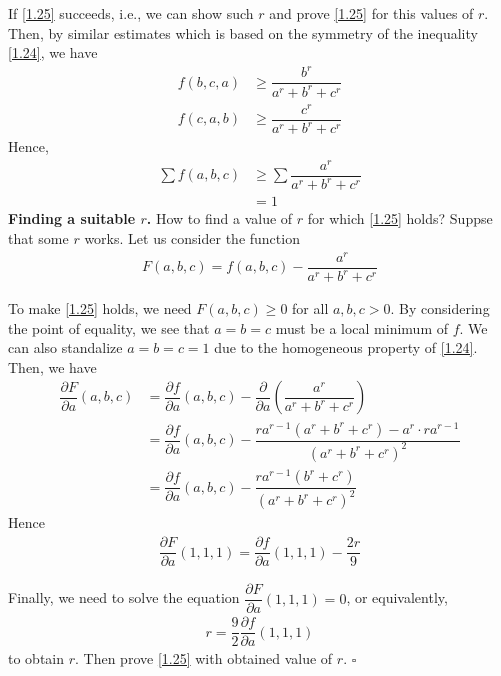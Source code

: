 \documentclass[a4paper,oneside]{article}
\numberwithin{equation}{section}
\begin{document}
If \eqref{1.25} succeeds, i.e., we can show such $r$ and prove \eqref{1.25} for this values of $r$. Then, by similar estimates which is based on the symmetry of the inequality \eqref{1.24}, we have
\begin{align}
f\left( {b,c,a} \right) &\ge \dfrac{{{b^r}}}{{{a^r} + {b^r} + {c^r}}}\\
f\left( {c,a,b} \right) &\ge \dfrac{{{c^r}}}{{{a^r} + {b^r} + {c^r}}}
\end{align}
Hence, 
\begin{align}
\sum {f\left( {a,b,c} \right)}  &\ge \sum {\dfrac{{{a^r}}}{{{a^r} + {b^r} + {c^r}}}} \\
& = 1
\end{align}
\textbf{Finding a suitable $r$.} How to find a value of $r$ for which \eqref{1.25} holds? Suppse that some $r$ works. Let us consider the function
\begin{align}
F\left( {a,b,c} \right) = f\left( {a,b,c} \right) - \dfrac{{{a^r}}}{{{a^r} + {b^r} + {c^r}}}
\end{align}

To make \eqref{1.25} holds, we need $F\left(a,b,c\right) \ge 0$ for all $a,b,c>0$. By considering the point of equality, we see that $a=b=c$ must be a local minimum of $f$. We can also standalize $a=b=c=1$ due to the homogeneous property of \eqref{1.24}. Then, we have
\begin{align}
\dfrac{{\partial F}}{{\partial a}}\left( {a,b,c} \right)& = \dfrac{{\partial f}}{{\partial a}}\left( {a,b,c} \right) - \dfrac{\partial }{{\partial a}}\left( {\dfrac{{{a^r}}}{{{a^r} + {b^r} + {c^r}}}} \right)\\
& = \dfrac{{\partial f}}{{\partial a}}\left( {a,b,c} \right) - \dfrac{{r{a^{r - 1}}\left( {{a^r} + {b^r} + {c^r}} \right) - {a^r} \cdot r{a^{r - 1}}}}{{{{\left( {{a^r} + {b^r} + {c^r}} \right)}^2}}}\\
& = \dfrac{{\partial f}}{{\partial a}}\left( {a,b,c} \right) - \dfrac{{r{a^{r - 1}}\left( {{b^r} + {c^r}} \right)}}{{{{\left( {{a^r} + {b^r} + {c^r}} \right)}^2}}}
\end{align}
Hence
\begin{align}
\dfrac{{\partial F}}{{\partial a}}\left( {1,1,1} \right) = \dfrac{{\partial f}}{{\partial a}}\left( {1,1,1} \right) - \dfrac{{2r}}{9}
\end{align}

Finally, we need to solve the equation $\dfrac{{\partial F}}{{\partial a}}\left( {1,1,1} \right) = 0$, or equivalently,
\begin{align}
r = \dfrac{9}{2}\dfrac{{\partial f}}{{\partial a}}\left( {1,1,1} \right)
\end{align}
to obtain $r$. Then prove \eqref{1.25} with obtained value of $r$. \hfill $\square$\\
\end{document}
